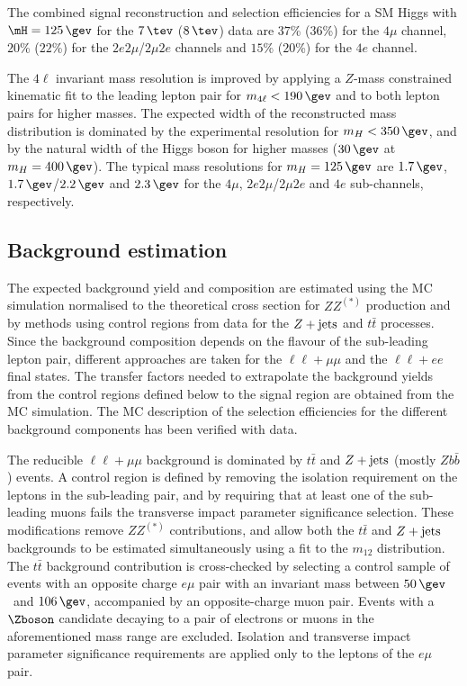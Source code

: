 \documentclass[final,3p,times,twocolumn]{elsarticle}
\begin{document}
  The combined signal reconstruction and selection efficiencies for a SM Higgs with $\mH=125\,\gev$
  for the $7\,\tev$ ($8\,\tev$) data are $37$\% ($36$\%) for the $4\mu$ channel,
  $20$\% ($22$\%) for the $2e2\mu$/$2\mu2e$ channels and $15$\%
  ($20$\%) for the $4e$ channel. 

  The $4\ell$ invariant mass resolution is improved by applying a
  $Z$-mass constrained kinematic fit to the leading lepton pair for
  $m_{4\ell}<190\,\gev$ and to both lepton pairs for higher masses. The
  expected width of the reconstructed mass distribution is
  dominated by the experimental resolution for $m_{H}<350\,\gev$,
  and by the natural width of the Higgs boson for higher masses ($30\,\gev$ at $m_{H} = 400\,\gev$). 
  The typical mass resolutions for $m_{H}=125\,\gev$ are $1.7\,\gev$, $1.7\,\gev$/$2.2\,\gev$ and
  $2.3\,\gev$ for the $4\mu$, $2e2\mu$/$2\mu2e$ and $4e$ sub-channels, respectively.

  \subsection{Background estimation}

  The expected background yield and composition are estimated
  using the MC simulation normalised to the theoretical cross section
  for $ZZ^{(*)}$ production and by methods using control regions from data for the
  $Z+\rm{jets}$ and $t\bar{t}$ processes. Since the background composition
  depends on the flavour of the sub-leading lepton pair, different
  approaches are taken for the $\ell\ell+\mu\mu$ and the $\ell\ell+ee$
  final states. The transfer factors needed to extrapolate the
  background yields from the control regions defined below to the signal
  region are obtained from the MC simulation. The MC description of the selection
  efficiencies for the different background components has been
  verified with data.

  The reducible $\ell\ell+\mu\mu$ background is dominated by
  $t\bar{t}$ and $Z+{\rm jets}$ (mostly $Zb\bar{b}$) 
  events. A control region is defined by removing the isolation
  requirement on the leptons in the sub-leading pair, and by requiring
  that at least one of the sub-leading muons fails the transverse impact
  parameter significance selection. These modifications remove
  $ZZ^{(*)}$ contributions, and allow both the $t\bar{t}$ and $Z+{\rm
  jets}$ backgrounds to be estimated simultaneously using a fit to the
  $m_{12}$ distribution. The $t\bar{t}$ background contribution is
  cross-checked by selecting a control sample of events 
  with an opposite charge $e\mu$ pair with an invariant mass
  between $50\,\gev$~and $106\,\gev$, accompanied by an opposite-charge
  muon pair. Events with a $\Zboson$ candidate decaying to a pair of
  electrons or muons in the aforementioned mass range are
  excluded. Isolation and transverse impact parameter significance requirements are applied
  only to the leptons of the $e\mu$ pair.
   
\end{document}
